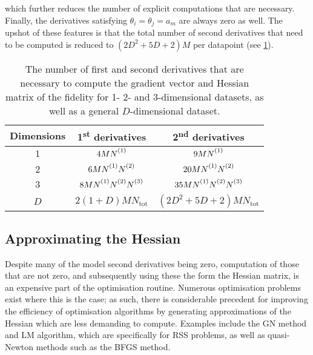 which further reduces the number of explicit computations that are necessary.
Finally, the derivatives satisfying $\theta_i = \theta_j = a_m$ are always
zero as well. The upshot of these features is that the total number of second
derivatives that need to be computed is reduced to $(2D^2 + 5D + 2)M$ per
datapoint (see \cref{tab:number-of-derivatives}).
\begin{table}
    \begin{center}
        \begin{tabular}{ c c c }
            \toprule
            Dimensions &
                \raisebox{\depth}{\#} 1\textsuperscript{st} derivatives &
                \raisebox{\depth}{\#} 2\textsuperscript{nd} derivatives\\
            \midrule
            $1$ & $4M\None$ & $9M\None$\\
            $2$ & $6M\None\Ntwo$ & $20M\None\Ntwo$\\
            $3$ & $8M\None\Ntwo\Nthree$ & $35M\None\Ntwo\Nthree$\\
            $D$ &  $2(1 + D)M N_{\text{tot}}$ &  $(2D^2 + 5D + 2) M N_{\text{tot}}$\\
            \bottomrule
        \end{tabular}
    \end{center}
    \caption{
        The number of first and second derivatives that are necessary to
        compute the gradient vector and Hessian matrix of the fidelity for
        1- 2- and 3-dimensional datasets, as well as a general $D$-dimensional
        dataset.
    }
    \label{tab:number-of-derivatives}
\end{table}

\subsection{Approximating the Hessian}
\label{subsec:hess-approx}
Despite many of the model second derivatives being zero, computation of those
that are not zero, and subsequently using these the form the Hessian matrix,
is an expensive part of the optimisation routine.
Numerous optimisation problems exist where this is the case; as such,
there is considerable precedent for improving the efficiency of optimisation
algorithms by generating approximations of the Hessian which are less demanding
to compute.
Examples include the \ac{GN} method and \ac{LM} algorithm,
which are specifically for \ac{RSS} problems\cite[Chapter
10]{Nocedal2006}, as well as quasi-Newton methods such as the \ac{BFGS}
method\cite[Chapter 6]{Nocedal2006}.


